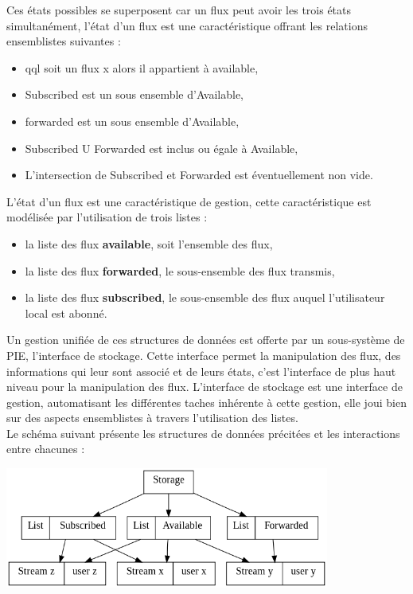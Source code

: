 Ces états possibles se superposent car un flux peut avoir les trois états simultanément,
l'état d'un flux est une caractéristique offrant les relations ensemblistes suivantes : \\

\begin{itemize}
	\item qql soit un flux x alors il appartient à available,
	\item Subscribed est un sous ensemble d'Available,
	\item forwarded est un sous ensemble d'Available,
	\item Subscribed U Forwarded est inclus ou égale à Available,
	\item L'intersection de Subscribed et Forwarded est éventuellement non vide.\\
\end{itemize}

L'état d'un flux est une caractéristique de gestion, cette caractéristique est modélisée
par l'utilisation de trois listes : \\

\begin{itemize}
	\item la liste des flux \textbf{available}, soit l'ensemble des flux,
	\item la liste des flux \textbf{forwarded}, le sous-ensemble des flux transmis,
	\item la liste des flux \textbf{subscribed}, le sous-ensemble des flux auquel l'utilisateur local est abonné. \\
\end{itemize}

Un gestion unifiée de ces structures de données est offerte par un sous-système de PIE,
l'interface de stockage. Cette interface permet la manipulation des flux, des informations 
qui leur sont associé et de leurs états, c'est l'interface de plus haut niveau pour la
manipulation des flux. L'interface de stockage est une interface de gestion, automatisant
les différentes taches inhérente à cette gestion, elle joui bien sur des aspects ensemblistes
à travers l'utilisation des listes. \\

Le schéma suivant présente les structures de données précitées et les interactions
entre chacunes :  \\

\begin{center}
    \includegraphics[width=0.8\textwidth]{img/struct.png}
\end{center}

